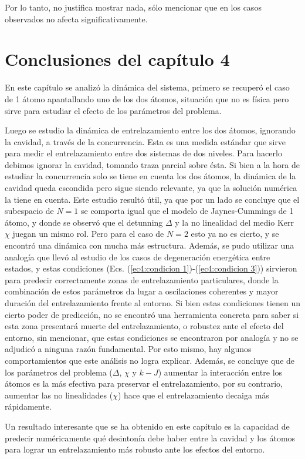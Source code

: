 Por lo tanto, no justifica mostrar nada, sólo mencionar que en los casos observados no afecta significativamente.

\section{Conclusiones del capítulo 4}

En este capítulo se analizó la dinámica del sistema, primero se recuperó el caso de 1 átomo apantallando uno de los dos átomos, situación que no es física pero sirve para estudiar el efecto de los parámetros del problema. 

Luego se estudio la dinámica de entrelazamiento entre los dos átomos, ignorando la cavidad, a través de la concurrencia. Esta es una medida estándar que sirve para medir el entrelazamiento entre dos sistemas de dos niveles. Para hacerlo debimos ignorar la cavidad, tomando traza parcial sobre ésta. Si bien a la hora de estudiar la concurrencia solo se tiene en cuenta los dos átomos, la dinámica de la cavidad queda escondida pero sigue siendo relevante, ya que la solución numérica la tiene en cuenta. Este estudio resultó útil, ya que por un lado se concluye que el subespacio de $N=1$ se comporta igual que el modelo de Jaynes-Cummings de 1 átomo, y donde se observó que el detunning $\Delta$ y la no linealidad del medio Kerr $\chi$ juegan un mismo rol. Pero para el caso de $N=2$ esto ya no es cierto, y se encontró una dinámica con mucha más estructura. Además, se pudo utilizar una analogía que llevó al estudio de los casos de degeneración energética entre estados, y estas condiciones (Ecs. (\ref{ec4:condicion 1})-(\ref{ec4:condicion 3})) sirvieron para predecir correctamente zonas de entrelazamiento particulares, donde la combinación de estos parámetros da lugar a oscilaciones coherentes y mayor duración del entrelazamiento frente al entorno. Si bien estas condiciones tienen un cierto poder de predicción, no se encontró una herramienta concreta para saber si esta zona presentará muerte del entrelazamiento, o robustez ante el efecto del entorno, sin mencionar, que estas condiciones se encontraron por analogía y no se adjudicó a ninguna razón fundamental. Por esto mismo, hay algunos comportamientos que este análisis no logra explicar. Además, se concluye que de los parámetros del problema ($\Delta$, $\chi$ y $k-J$) aumentar la interacción entre los átomos es la más efectiva para preservar el entrelazamiento, por su contrario, aumentar las no linealidades ($\chi$) hace que el entrelazamiento decaiga más rápidamente.

Un resultado interesante que se ha obtenido en este capítulo es la capacidad de predecir numéricamente qué desintonía debe haber entre la cavidad y los átomos para lograr un entrelazamiento más robusto ante los efectos del entorno. 
